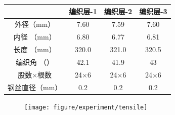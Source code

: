 \begin{table}[!htbp]
	\centering
	\label{tab:hose-specimen}
	\begin{tabular*}{0.8\textwidth}{@{\extracolsep{\fill}}>{\hspace{0.5cm}}cccc}
		\toprule
		                  &     编织层-1     &     编织层-2     &     编织层-3     \\ \midrule
		外径（mm）            &     7.60      &     7.59      &     7.60      \\
		内径 （mm）           &     6.80      &     6.77      &     6.81      \\
		长度 （mm）           &     320.0     &     321.0     &     320.5     \\
		编织角 （\textdegree） &     42.1      &     41.9      &      43       \\
		股数$ \times $根数    & 24$ \times $6 & 24$ \times $6 & 24$ \times $6 \\
		钢丝直径（mm）          &      0.2      &      0.2      &      0.2      \\ \bottomrule
	\end{tabular*} 
\end{table}







\begin{figure}[!htbp]
\centering
\texttt{[image: figure/experiment/tensile]}
	\label{fig:experiment-1}
\end{figure}






